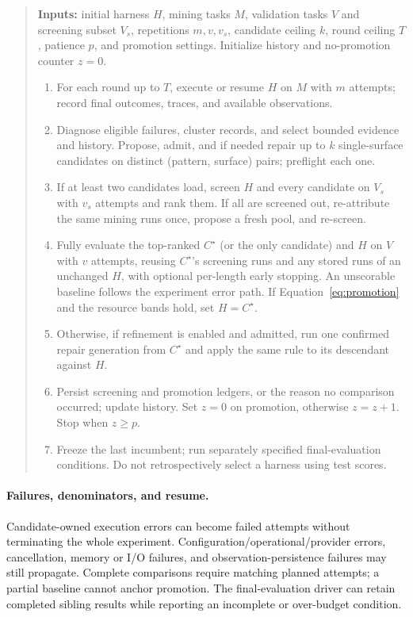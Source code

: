 \begin{quote}\small
\textbf{Inputs:} initial harness $H$, mining tasks $M$, validation tasks $V$ and
screening subset $V_s$, repetitions $m,v,v_s$, candidate ceiling $k$, round
ceiling $T$, patience $p$, and promotion settings. Initialize history and
no-promotion counter $z=0$.
\begin{enumerate}
\item For each round up to $T$, execute or resume $H$ on $M$ with $m$ attempts;
record final outcomes, traces, and available observations.
\item Diagnose eligible failures, cluster records, and select bounded evidence
and history. Propose, admit, and if needed repair up to $k$ single-surface
candidates on distinct (pattern, surface) pairs; preflight each one.
\item If at least two candidates load, screen $H$ and every candidate on $V_s$
with $v_s$ attempts and rank them. If all are screened out, re-attribute the
same mining runs once, propose a fresh pool, and re-screen.
\item Fully evaluate the top-ranked $C^\star$ (or the only candidate) and $H$
on $V$ with $v$ attempts, reusing $C^\star$'s screening runs and any stored runs
of an unchanged $H$, with optional per-length early stopping. An unscorable
baseline follows the experiment error path. If Equation~\ref{eq:promotion} and
the resource bands hold, set $H=C^\star$.
\item Otherwise, if refinement is enabled and admitted, run one confirmed repair
generation from $C^\star$ and apply the same rule to its descendant against $H$.
\item Persist screening and promotion ledgers, or the reason no comparison
occurred; update history. Set $z=0$ on promotion, otherwise $z=z+1$. Stop when
$z\geq p$.
\item Freeze the last incumbent; run separately specified final-evaluation
conditions. Do not retrospectively select a harness using test scores.
\end{enumerate}
\end{quote}

\paragraph{Failures, denominators, and resume.}
Candidate-owned execution errors can become failed attempts without terminating
the whole experiment. Configuration/operational/provider errors, cancellation,
memory or I/O failures, and observation-persistence failures may still propagate.
Complete comparisons require matching planned attempts; a partial baseline cannot
anchor promotion. The final-evaluation driver can retain completed sibling
results while reporting an incomplete or over-budget condition.

